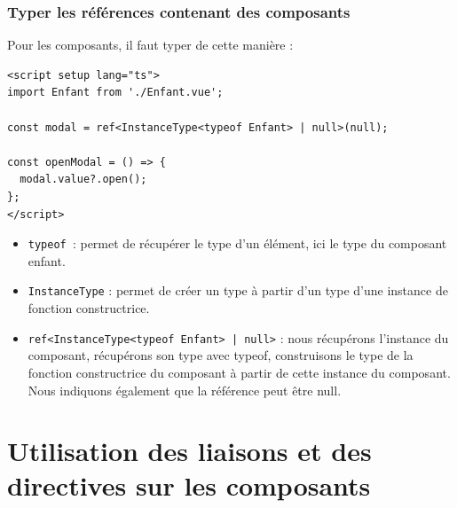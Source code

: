 \subsubsection{Typer les références contenant des composants}
Pour les composants, il faut typer de cette manière :
\begin{verbatim}
<script setup lang="ts">
import Enfant from './Enfant.vue';

const modal = ref<InstanceType<typeof Enfant> | null>(null);

const openModal = () => {
  modal.value?.open();
};
</script>
\end{verbatim}
\begin{itemize}
\item {\tt typeof }: permet de récupérer le type d'un élément, ici le type du composant enfant.

\item {\tt InstanceType} : permet de créer un type à partir d'un type d'une instance de fonction constructrice.

\item {\tt ref<InstanceType<typeof Enfant> | null>} : nous récupérons l'instance du composant, récupérons son type avec {\color{monOrange}typeof}, construisons le type de la fonction constructrice du composant à partir de cette instance du composant. Nous indiquons également que la référence peut être {\color{monOrange}null}.

\end{itemize}


\section{Utilisation des liaisons et des directives sur les composants}
